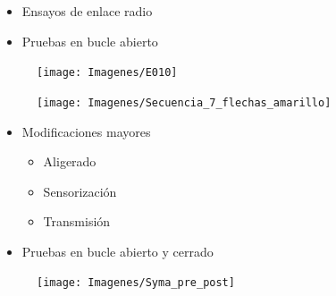 \documentclass[a4,landscpae]{seminar}
\begin{document}
\begin{hslide}
\begin{minipage}{20cm}
	\begin{minipage}{5.2cm}
		\begin{itemize}
			\item Ensayos de enlace radio
			\item Pruebas en bucle abierto
		\end{itemize}
	\end{minipage}
	\begin{minipage}{6cm}
		\begin{figure}
			\texttt{[image: Imagenes/E010]}
		\end{figure}
	\end{minipage}
\end{minipage} \vfill
\begin{minipage}{2cm}
	\begin{center}
		\begin{figure}
			\texttt{[image: Imagenes/Secuencia\_7\_flechas\_amarillo]}
		\end{figure}
	\end{center}
\end{minipage} \vfill
\end{hslide}
\begin{hslide}
\begin{minipage}{20cm}
	\begin{minipage}{7.2cm}
		\begin{itemize}
			\item Modificaciones mayores
				\begin{itemize}
					\item Aligerado
					\item Sensorizaci\'on
					\item Transmisi\'on
				\end{itemize}
			\item Pruebas en bucle abierto y cerrado
		\end{itemize}
	\end{minipage}
\end{minipage} \hfill
\begin{minipage}{3cm}
	\begin{center}
		\begin{figure}
			\texttt{[image: Imagenes/Syma\_pre\_post]}
		\end{figure}
	\end{center}
\end{minipage} \vfill
\end{hslide}
\end{document}
